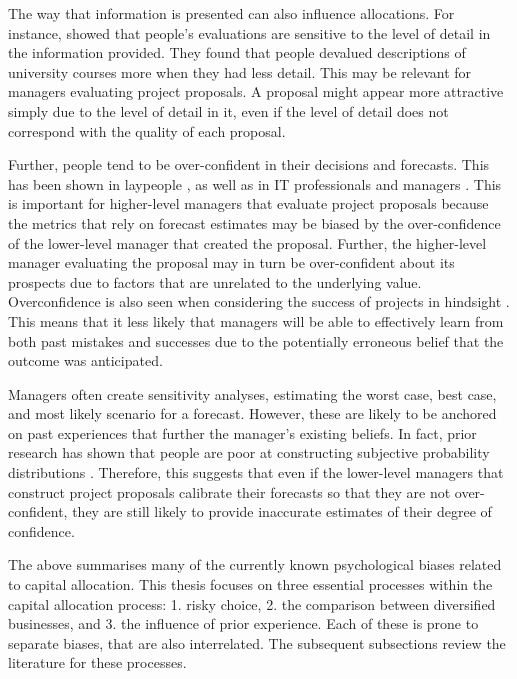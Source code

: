 \documentclass[a4paper, nobind, dvipsnames]{templates/ociamthesis}
\theoremstyle{definition}
\theoremstyle{definition}
\theoremstyle{definition}
\theoremstyle{definition}
\theoremstyle{remark}
\begin{document}
The way that information is presented can also influence allocations. For
instance, \textcite{yates1978} showed that people's evaluations are sensitive to the level
of detail in the information provided. They found that people devalued
descriptions of university courses more when they had less detail. This may be
relevant for managers evaluating project proposals. A proposal might appear more
attractive simply due to the level of detail in it, even if the level of detail
does not correspond with the quality of each proposal.

Further, people tend to be over-confident in their decisions and forecasts. This
has been shown in laypeople \autocite{langer1975,mannes2013,soll2004,puri2007}, as
well as in IT professionals \autocite{mckenzie2008} and managers \autocite{lovallo2003,kahneman1993,baroneadesi2013}. This is important for higher-level managers
that evaluate project proposals because the metrics that rely on forecast
estimates may be biased by the over-confidence of the lower-level manager that
created the proposal. Further, the higher-level manager evaluating the proposal
may in turn be over-confident about its prospects due to factors that are
unrelated to the underlying value. Overconfidence is also seen when considering
the success of projects in hindsight \autocite{bukszar1988,christensenszalanski1991}.
This means that it less likely that managers will be able to effectively learn
from both past mistakes and successes due to the potentially erroneous belief
that the outcome was anticipated.

Managers often create sensitivity analyses, estimating the worst case, best
case, and most likely scenario for a forecast. However, these are likely to be
anchored on past experiences that further the manager's existing beliefs. In
fact, prior research has shown that people are poor at constructing subjective
probability distributions \autocites[e.g.,][]{alpert1982,schaefer1973,staelvonholstein1971,tversky1974}. Therefore, this suggests that even if the
lower-level managers that construct project proposals calibrate their forecasts
so that they are not over-confident, they are still likely to provide inaccurate
estimates of their degree of confidence.

The above summarises many of the currently known psychological biases related to
capital allocation. This thesis focuses on three essential processes within the
capital allocation process: 1. risky choice, 2. the comparison between
diversified businesses, and 3. the influence of prior experience. Each of these
is prone to separate biases, that are also interrelated. The subsequent
subsections review the literature for these processes.
\end{document}
